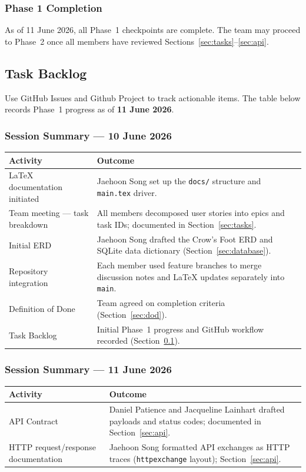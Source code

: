 \subsubsection{Phase 1 Completion}
As of 11 June 2026, all Phase~1 checkpoints are complete. The team may proceed to Phase~2 once all
members have reviewed Sections~\ref{sec:tasks}--\ref{sec:api}.

\newpage
\subsection{Task Backlog}\label{sec:task-backlog}
Use GitHub Issues and Github Project to track actionable items. The table below records Phase~1
progress as of \textbf{11 June 2026}.

\subsubsection{Session Summary --- 10 June 2026}
\begin{tabularx}{\textwidth}{@{} l X @{}}
  \toprule
  \textbf{Activity} & \textbf{Outcome} \\
  \midrule
  LaTeX documentation initiated & Jaehoon Song set up the \texttt{docs/} structure and \texttt{main.tex} driver. \\
  Team meeting --- task breakdown & All members decomposed user stories into epics and task IDs; documented in Section~\ref{sec:tasks}. \\
  Initial ERD & Jaehoon Song drafted the Crow's Foot ERD and SQLite data dictionary (Section~\ref{sec:database}). \\
  Repository integration & Each member used feature branches to merge discussion notes and LaTeX updates separately into \texttt{main}. \\
  Definition of Done & Team agreed on completion criteria (Section~\ref{sec:dod}). \\
  Task Backlog & Initial Phase~1 progress and GitHub workflow recorded (Section~\ref{sec:task-backlog}). \\
  \bottomrule
\end{tabularx}

\subsubsection{Session Summary --- 11 June 2026}
\begin{tabularx}{\textwidth}{@{} l X @{}}
  \toprule
  \textbf{Activity} & \textbf{Outcome} \\
  \midrule
  API Contract & Daniel Patience and Jacqueline Lainhart drafted payloads and status codes; documented in Section~\ref{sec:api}. \\
  HTTP request/response documentation & Jaehoon Song formatted API exchanges as HTTP traces (\texttt{httpexchange} layout); Section~\ref{sec:api}. \\
  \bottomrule
\end{tabularx}

